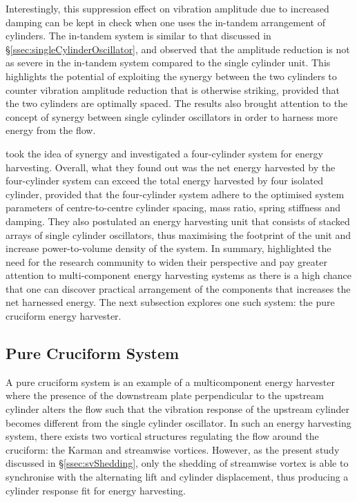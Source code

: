 \documentclass[oneside]{utmthesis}
\begin{document}
Interestingly, this suppression effect on vibration amplitude due to increased damping can be kept in check when one uses the in-tandem arrangement of cylinders. The in-tandem system is similar to that discussed in \S\ref{ssec:singleCylinderOscillator}, and \citet{Sun2019b} observed that the amplitude reduction is not as severe in the in-tandem system compared to the single cylinder unit. This highlights the potential of exploiting the synergy between the two cylinders to counter vibration amplitude reduction that is otherwise striking, provided that the two cylinders are optimally spaced. The results also brought attention to the concept of synergy between single cylinder oscillators in order to harness more energy from the flow.

\citet{Kim2016} took the idea of synergy and investigated a four-cylinder system for energy harvesting. Overall, what they found out was the net energy harvested by the four-cylinder system can exceed the total energy harvested by four isolated cylinder, provided that the four-cylinder system adhere to the optimised system parameters of centre-to-centre cylinder spacing, mass ratio, spring stiffness and damping. They also postulated an energy harvesting unit that consists of stacked arrays of single cylinder oscillators, thus maximising the footprint of the unit and increase power-to-volume density of the system. In summary, \citet{Kim2016} highlighted the need for the research community to widen their perspective and pay greater attention to multi-component energy harvesting systems as there is a high chance that one can discover practical arrangement of the components that increases the net harnessed energy. The next subsection explores one such system: the pure cruciform energy harvester.

\subsection{Pure Cruciform System} \label{ssec:pureCruciformHarvester}
A pure cruciform system is an example of a multicomponent energy harvester where the presence of the downstream plate perpendicular to the upstream cylinder alters the flow such that the vibration response of the upstream cylinder becomes different from the single cylinder oscillator. In such an energy harvesting system, there exists two vortical structures regulating the flow around the cruciform: the Karman and streamwise vortices. However, as the present study discussed in \S\ref{ssec:svShedding}, only the shedding of streamwise vortex is able to synchronise with the alternating lift and cylinder displacement, thus producing a cylinder response fit for energy harvesting.
\end{document}
